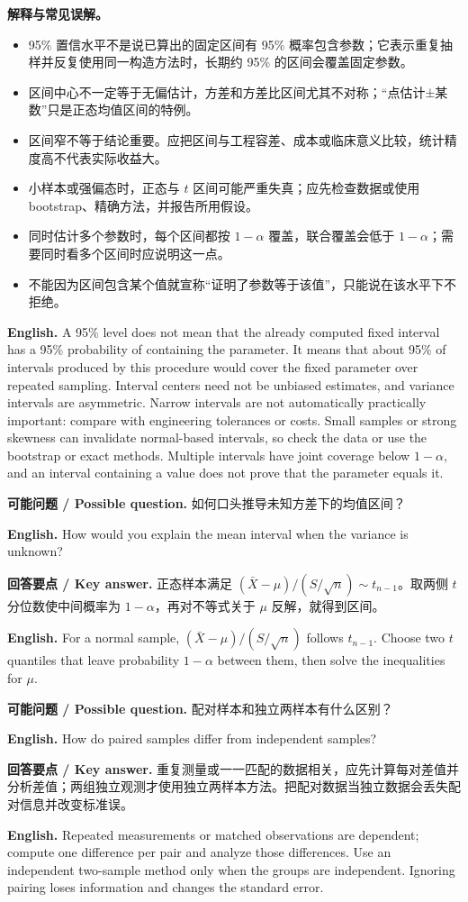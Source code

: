 \documentclass[UTF8,11pt,a4paper]{ctexart}
\newcommand{\EN}[1]{\par\noindent\textbf{English.} #1\par}
\newcommand{\ASK}[4]{\par\noindent\textbf{可能问题 / Possible question.} #1\par\EN{#2}\noindent\textbf{回答要点 / Key answer.} #3\par\EN{#4}\medskip}
\begin{document}
\noindent\textbf{解释与常见误解。}
\begin{itemize}[leftmargin=1.2em]
\item 95\% 置信水平不是说已算出的固定区间有 95\% 概率包含参数；它表示重复抽样并反复使用同一构造方法时，长期约 95\% 的区间会覆盖固定参数。
\item 区间中心不一定等于无偏估计，方差和方差比区间尤其不对称；“点估计±某数”只是正态均值区间的特例。
\item 区间窄不等于结论重要。应把区间与工程容差、成本或临床意义比较，统计精度高不代表实际收益大。
\item 小样本或强偏态时，正态与 $t$ 区间可能严重失真；应先检查数据或使用 bootstrap、精确方法，并报告所用假设。
\item 同时估计多个参数时，每个区间都按 $1-\alpha$ 覆盖，联合覆盖会低于 $1-\alpha$；需要同时看多个区间时应说明这一点。
\item 不能因为区间包含某个值就宣称“证明了参数等于该值”，只能说在该水平下不拒绝。
\end{itemize}
\EN{A 95\% level does not mean that the already computed fixed interval has a 95\% probability of containing the parameter. It means that about 95\% of intervals produced by this procedure would cover the fixed parameter over repeated sampling. Interval centers need not be unbiased estimates, and variance intervals are asymmetric. Narrow intervals are not automatically practically important: compare with engineering tolerances or costs. Small samples or strong skewness can invalidate normal-based intervals, so check the data or use the bootstrap or exact methods. Multiple intervals have joint coverage below $1-\alpha$, and an interval containing a value does not prove that the parameter equals it.}

\ASK{如何口头推导未知方差下的均值区间？}{How would you explain the mean interval when the variance is unknown?}{正态样本满足 $(\bar X-\mu)/(S/\sqrt n)\sim t_{n-1}$。取两侧 $t$ 分位数使中间概率为 $1-\alpha$，再对不等式关于 $\mu$ 反解，就得到区间。}{For a normal sample, $(\bar X-\mu)/(S/\sqrt n)$ follows $t_{n-1}$. Choose two $t$ quantiles that leave probability $1-\alpha$ between them, then solve the inequalities for $\mu$.}

\ASK{配对样本和独立两样本有什么区别？}{How do paired samples differ from independent samples?}{重复测量或一一匹配的数据相关，应先计算每对差值并分析差值；两组独立观测才使用独立两样本方法。把配对数据当独立数据会丢失配对信息并改变标准误。}{Repeated measurements or matched observations are dependent; compute one difference per pair and analyze those differences. Use an independent two-sample method only when the groups are independent. Ignoring pairing loses information and changes the standard error.}
\end{document}
